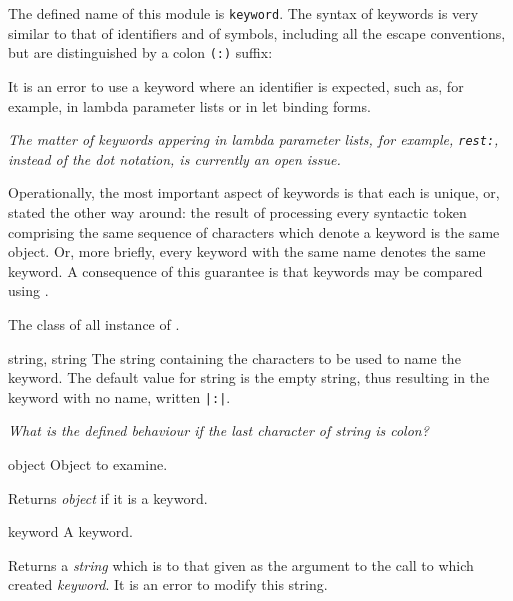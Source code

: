 \label{keyword}
%
\begin{optDefinition}
The defined name of this module is {\tt keyword}.
%
%
The syntax of keywords is very similar to that of identifiers and of symbols,
including all the escape conventions, but are distinguished by a colon {\tt (:)}
suffix:
%
\Syntax
{}%
%

It is an error to use a keyword where an identifier is expected, such as, for
example, in lambda parameter lists or in let binding forms.

{\em The matter of keywords appering in lambda parameter lists, for example,
    {\tt rest:}, instead of the dot notation, is currently an open issue.}

Operationally, the most important aspect of keywords is that each is unique, or,
stated the other way around: the result of processing every syntactic token
comprising the same sequence of characters which denote a keyword is the same
object. Or, more briefly, every keyword with the same name denotes the same
keyword. A consequence of this guarantee is that keywords may be compared using
.

%
The class of all instance of .
%
\begin{initoptions}
    \item[string, string] The string containing the characters to be used to
    name the keyword. The default value for string is the empty string, thus
    resulting in the keyword with no name, written \verb+|:|+.
\end{initoptions}
%
{\em What is the defined behaviour if the last character of string is colon?}

%
\begin{arguments}
    \item[object] Object to examine.
\end{arguments}
%
\result%
Returns {\em object\/} if it is a keyword.

%
\begin{arguments}
    \item[keyword] A keyword.
\end{arguments}
%
\result%
Returns a {\em string\/} which is  to that given as the
argument to the call to  which created {\em keyword}. It is an
error to modify this string.


\end{optDefinition}
